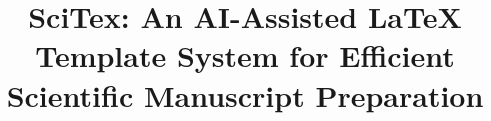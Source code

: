 
\title{
    SciTex: An AI-Assisted LaTeX Template System for Efficient Scientific Manuscript Preparation
}

